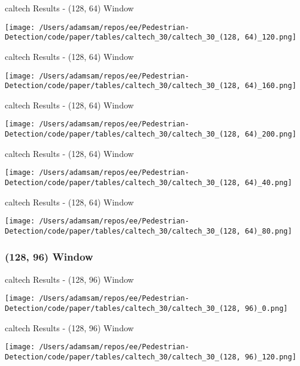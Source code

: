 \begin{table}
    \caption{caltech Results - (128, 64) Window}
    \texttt{[image: /Users/adamsam/repos/ee/Pedestrian-Detection/code/paper/tables/caltech\_30/caltech\_30\_(128, 64)\_120.png]}
    \label{tab:caltech_30_(128, 64)_120}
\end{table}

\begin{table}
    \caption{caltech Results - (128, 64) Window}
    \texttt{[image: /Users/adamsam/repos/ee/Pedestrian-Detection/code/paper/tables/caltech\_30/caltech\_30\_(128, 64)\_160.png]}
    \label{tab:caltech_30_(128, 64)_160}
\end{table}

\begin{table}
    \caption{caltech Results - (128, 64) Window}
    \texttt{[image: /Users/adamsam/repos/ee/Pedestrian-Detection/code/paper/tables/caltech\_30/caltech\_30\_(128, 64)\_200.png]}
    \label{tab:caltech_30_(128, 64)_200}
\end{table}

\begin{table}
    \caption{caltech Results - (128, 64) Window}
    \texttt{[image: /Users/adamsam/repos/ee/Pedestrian-Detection/code/paper/tables/caltech\_30/caltech\_30\_(128, 64)\_40.png]}
    \label{tab:caltech_30_(128, 64)_40}
\end{table}

\begin{table}
    \caption{caltech Results - (128, 64) Window}
    \texttt{[image: /Users/adamsam/repos/ee/Pedestrian-Detection/code/paper/tables/caltech\_30/caltech\_30\_(128, 64)\_80.png]}
    \label{tab:caltech_30_(128, 64)_80}
\end{table}

\subsubsection*{(128, 96) Window}

\begin{table}
    \caption{caltech Results - (128, 96) Window}
    \texttt{[image: /Users/adamsam/repos/ee/Pedestrian-Detection/code/paper/tables/caltech\_30/caltech\_30\_(128, 96)\_0.png]}
    \label{tab:caltech_30_(128, 96)_0}
\end{table}

\begin{table}
    \caption{caltech Results - (128, 96) Window}
    \texttt{[image: /Users/adamsam/repos/ee/Pedestrian-Detection/code/paper/tables/caltech\_30/caltech\_30\_(128, 96)\_120.png]}
    \label{tab:caltech_30_(128, 96)_120}
\end{table}

